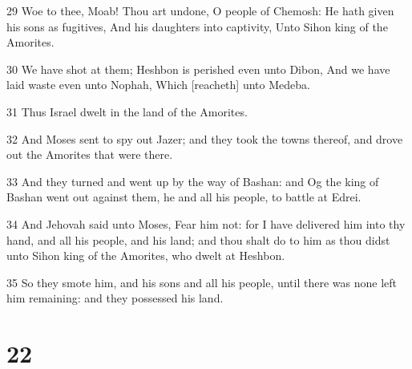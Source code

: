 \par 29 Woe to thee, Moab! Thou art undone, O people of Chemosh: He hath given his sons as fugitives, And his daughters into captivity, Unto Sihon king of the Amorites.
\par 30 We have shot at them; Heshbon is perished even unto Dibon, And we have laid waste even unto Nophah, Which [reacheth] unto Medeba.
\par 31 Thus Israel dwelt in the land of the Amorites.
\par 32 And Moses sent to spy out Jazer; and they took the towns thereof, and drove out the Amorites that were there.
\par 33 And they turned and went up by the way of Bashan: and Og the king of Bashan went out against them, he and all his people, to battle at Edrei.
\par 34 And Jehovah said unto Moses, Fear him not: for I have delivered him into thy hand, and all his people, and his land; and thou shalt do to him as thou didst unto Sihon king of the Amorites, who dwelt at Heshbon.
\par 35 So they smote him, and his sons and all his people, until there was none left him remaining: and they possessed his land.

\chapter{22}

